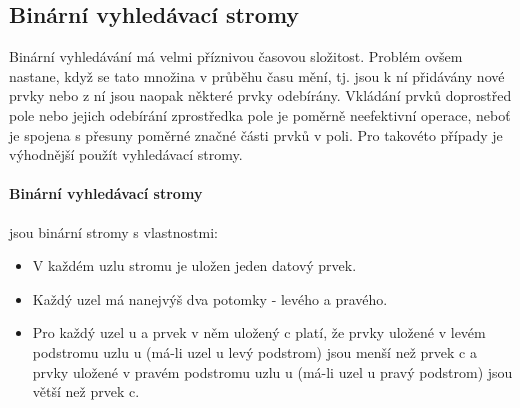 \documentclass[10pt,a4paper]{article}
\begin{document}
\subsection{Binární vyhledávací stromy}
Binární vyhledávání má velmi příznivou časovou složitost. Problém ovšem nastane, když se tato množina v průběhu času mění, tj. jsou k ní přidávány nové prvky nebo z ní jsou naopak některé prvky odebírány.
Vkládání prvků doprostřed pole nebo jejich odebírání zprostředka pole je poměrně neefektivní operace, neboť je spojena s přesuny poměrné značné části prvků v poli. Pro takovéto případy je výhodnější použít vyhledávací stromy.
\paragraph{Binární vyhledávací stromy}
jsou binární stromy s vlastnostmi:
\begin{itemize}
	\item V každém uzlu stromu je uložen jeden datový prvek.
	\item Každý uzel má nanejvýš dva potomky - levého a pravého.
	\item Pro každý uzel u a prvek v něm uložený c platí, že prvky uložené v levém podstromu uzlu u (má-li uzel u levý podstrom) jsou menší než prvek c a prvky uložené v pravém podstromu uzlu u (má-li uzel u pravý podstrom) jsou větší než prvek c.
\end{itemize}
\end{document}
